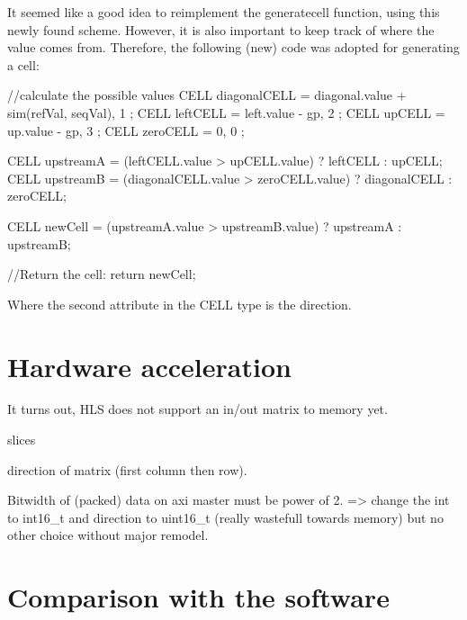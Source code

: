 It seemed like a good idea to reimplement the generatecell function, using this newly found scheme. However, it is also important to keep track of where the value comes from. Therefore, the following (new) code was adopted for generating a cell:

\begin{lcverbatim}
	//calculate the possible  values
	CELL diagonalCELL = { diagonal.value + sim(refVal, seqVal), 1 };
	CELL leftCELL = { left.value - gp, 2 };
	CELL upCELL = { up.value - gp, 3 };
	CELL zeroCELL = { 0, 0 };
	
	CELL upstreamA = (leftCELL.value > upCELL.value) ? leftCELL : upCELL;
	CELL upstreamB = (diagonalCELL.value > zeroCELL.value) ? 
	diagonalCELL : zeroCELL;
	
	CELL newCell = (upstreamA.value > upstreamB.value) ? upstreamA : upstreamB;
	
	//Return the cell:
	return newCell;
\end{lcverbatim}

Where the second attribute in the CELL type is the direction.

\section{Hardware acceleration}

It turns out, HLS does not support an in/out matrix to memory yet.

slices

direction of matrix (first column then row).

Bitwidth of (packed) data on axi master must be power of 2. => change the int to int16\_t and direction to uint16\_t (really wastefull towards memory) but no other choice without major remodel.

\section{Comparison with the software}